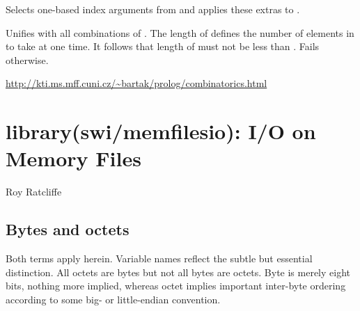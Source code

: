 \begin{description}
Selects one-based index arguments from  and applies these
extras to .

\begin{tags}
\end{tags}

Unifies  with all combinations of . The length of 
defines the number of elements in  to take at one time. It
follows that length of  must not be less than . Fails
otherwise.

\begin{tags}
\url{http://kti.ms.mff.cuni.cz/~bartak/prolog/combinatorics.html}
\end{tags}
\end{description}

\chapter{library(swi/memfilesio): I/O on Memory Files}\label{sec:memfilesio}

\begin{tags}
Roy Ratcliffe
\end{tags}

\section{Bytes and octets}

Both terms apply herein. Variable names reflect the subtle
but essential distinction. All octets are bytes but not all bytes are
octets. Byte is merely eight bits, nothing more implied, whereas octet
implies important inter-byte ordering according to some big- or
little-endian convention.\vspace{0.7cm}

